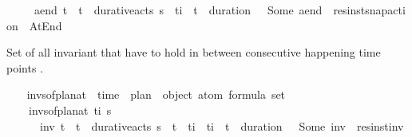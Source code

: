\begin{isabellebody}
\ \ \ \ {\isasymunion}\ {\isacharbraceleft}{\kern0pt}a\isactrlsub e\isactrlsub n\isactrlsub d{\isachardot}{\kern0pt}\ {\isasymexists}t{\isacharprime}{\kern0pt}\ {\isasympi}{\isachardot}{\kern0pt}\ {\isacharparenleft}{\kern0pt}t{\isacharprime}{\kern0pt}{\isacharcomma}{\kern0pt}{\isasympi}{\isacharparenright}{\kern0pt}\ {\isasymin}\ durative{\isacharunderscore}{\kern0pt}acts\ {\isasympi}s\ {\isasymand}\ t\isactrlsub i\ {\isacharequal}{\kern0pt}\ t{\isacharprime}{\kern0pt}\ {\isacharplus}{\kern0pt}\ duration\ {\isasympi}\ {\isasymand}\ Some\ a\isactrlsub e\isactrlsub n\isactrlsub d\ {\isacharequal}{\kern0pt}\ res{\isacharunderscore}{\kern0pt}inst{\isacharunderscore}{\kern0pt}snap{\isacharunderscore}{\kern0pt}action\ {\isasympi}\ At{\isacharunderscore}{\kern0pt}End{\isacharbraceright}{\kern0pt}{\isachardoublequoteclose}%
\begin{isamarkuptext}%
Set of all invariant that have to hold in between consecutive happening time points .%
\end{isamarkuptext}\isamarkuptrue%
\ \ \isamarkupfalse%
\ invs{\isacharunderscore}{\kern0pt}of{\isacharunderscore}{\kern0pt}plan{\isacharunderscore}{\kern0pt}at\ {\isacharcolon}{\kern0pt}{\isacharcolon}{\kern0pt}\ {\isachardoublequoteopen}time\ {\isasymRightarrow}\ plan\ {\isasymRightarrow}\ {\isacharparenleft}{\kern0pt}object\ atom{\isacharparenright}{\kern0pt}\ formula\ set{\isachardoublequoteclose}\ \isanewline
\ \ \ \ {\isachardoublequoteopen}invs{\isacharunderscore}{\kern0pt}of{\isacharunderscore}{\kern0pt}plan{\isacharunderscore}{\kern0pt}at\ t\isactrlsub i\ {\isasympi}s\ {\isacharequal}{\kern0pt}\ \isanewline
\ \ \ \ \ \ {\isacharbraceleft}{\kern0pt}inv{\isachardot}{\kern0pt}\ {\isasymexists}t\isactrlsub {\isasympi}\ {\isasympi}{\isachardot}{\kern0pt}\ {\isacharparenleft}{\kern0pt}t\isactrlsub {\isasympi}{\isacharcomma}{\kern0pt}{\isasympi}{\isacharparenright}{\kern0pt}\ {\isasymin}\ durative{\isacharunderscore}{\kern0pt}acts\ {\isasympi}s\ {\isasymand}\ t\isactrlsub {\isasympi}\ {\isacharless}{\kern0pt}\ t\isactrlsub i\ {\isasymand}\ t\isactrlsub i\ {\isasymle}\ t\isactrlsub {\isasympi}\ {\isacharplus}{\kern0pt}\ {\isacharparenleft}{\kern0pt}duration\ {\isasympi}{\isacharparenright}{\kern0pt}\ {\isasymand}\ Some\ inv\ {\isacharequal}{\kern0pt}\ res{\isacharunderscore}{\kern0pt}inst{\isacharunderscore}{\kern0pt}inv\ {\isasympi}{\isacharbraceright}{\kern0pt}{\isachardoublequoteclose}%
\begin{isamarkuptext}%

\end{isamarkuptext}
\end{isabellebody}
